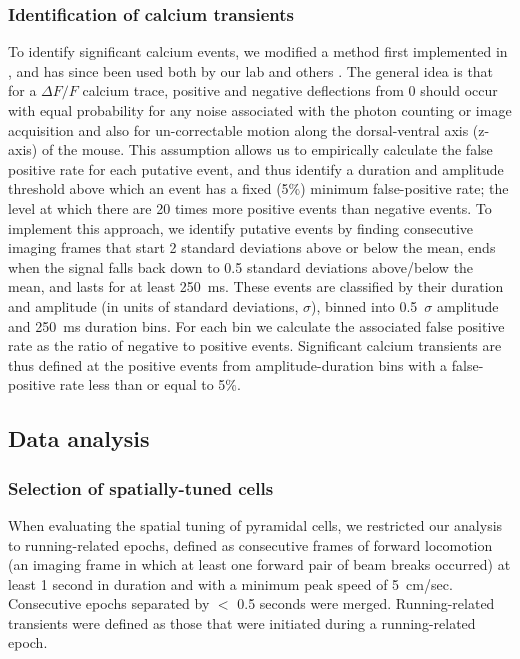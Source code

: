 \subsubsection{Identification of calcium transients}
To identify significant calcium events, we modified a method first implemented in \citealt{Dombeck2007}, and has since been used both by our lab \citep{Danielson2016a, Danielson2016b, Lovett-Barron2014} and others \citep{Dombeck2010, Rajasethupathy2015}. The general idea is that for a $\Delta F/F$ calcium trace, positive and negative deflections from 0 should occur with equal probability for any noise associated with the photon counting or image acquisition and also for un-correctable motion along the dorsal-ventral axis (z-axis) of the mouse. This assumption allows us to empirically calculate the false positive rate for each putative event, and thus identify a duration and amplitude threshold above which an event has a fixed (5$\%$) minimum false-positive rate; the level at which there are 20 times more positive events than negative events. To implement this approach, we identify putative events by finding consecutive imaging frames that start 2 standard deviations above or below the mean, ends when the signal falls back down to 0.5 standard deviations above/below the mean, and lasts for at least 250~ms. These events are classified by their duration and amplitude (in units of standard deviations, $\sigma$), binned into 0.5~$\sigma$ amplitude and 250~ms duration bins. For each bin we calculate the associated false positive rate as the ratio of negative to positive events. Significant calcium transients are thus defined at the positive events from amplitude-duration bins with a false-positive rate less than or equal to 5$\%$.

\subsection{Data analysis}
\subsubsection{Selection of spatially-tuned cells}\label{sec:df:methods:pc_identification}
When evaluating the spatial tuning of pyramidal cells, we restricted our analysis to running-related epochs, defined as consecutive frames of forward locomotion (an imaging frame in which at least one forward pair of beam breaks occurred) at least 1 second in duration and with a minimum peak speed of 5~cm/sec. Consecutive epochs separated by $<$ 0.5 seconds were merged. Running-related transients were defined as those that were initiated during a running-related epoch.

